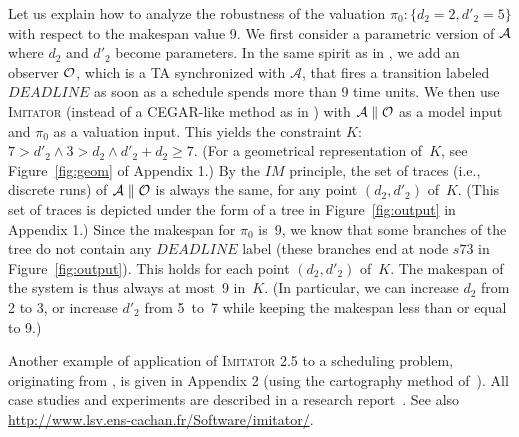 \documentclass{article}
\newcommand{\A}{\mathcal{A}}
\newcommand{\Ko}{K}
\newcommand{\pio}{\pi_0}
\newcommand{\IM}{\mathit{IM}}
\newcommand{\imitator}{\textsc{Imitator}}
\begin{document}
Let us explain how to analyze the robustness of the
valuation $\pio:\{d_2=2,d'_2=5\}$ with respect to the makespan value 9.
We first consider a parametric version of ${\cal A}$ where
$d_2$ and $d'_2$ become parameters.
In the same spirit as in \cite{cpr08},
we add an observer ${\cal O}$, which is a TA
synchronized with $\A$, that fires a transition labeled $\mathit{DEADLINE}$ as soon as a schedule spends more than 9 time units.
We then use \imitator{} (instead of a CEGAR-like method
as in \cite{cpr08}) with $\A \parallel {\cal O}$ as a model input
and $\pio$ as a valuation input.
This yields the constraint $\Ko$:  $7 > d'_2 \wedge 3 > d_2 \wedge d'_2 + d_2 \geq 7$.
(For a geometrical representation of~$\Ko$, see Figure~\ref{fig:geom} of Appendix 1.)
By the $\IM$ principle, the set of traces (i.e., discrete runs) of
$\A \parallel {\cal O}$ is always the same,
for any point $(d_2,d'_2)$ of~$\Ko$.
(This set of traces is depicted under the form of a tree in Figure~\ref{fig:output} in Appendix 1.)
Since the makespan for $\pio$ is~9,
we know that some branches of the tree do not contain
any $\mathit{DEADLINE}$ label (these branches end at node $s73$
in Figure~\ref{fig:output}).
This holds for each point $(d_2,d'_2)$ of~$\Ko$.
The makespan of the system is thus always at most~9 in~$\Ko$. (In particular, we can increase $d_2$ from 2 to 3, or increase $d'_2$ from 5~to~7
while keeping the makespan less than or equal to 9.)




Another example of application of \imitator{} 2.5 to a scheduling problem, originating from \cite{bb04}, is given in Appendix 2 (using 
the cartography method of~\cite{af10}). 
All case studies and experiments %
are described in a research report~\cite{soulat12}. See also \url{http://www.lsv.ens-cachan.fr/Software/imitator/}.
\end{document}
